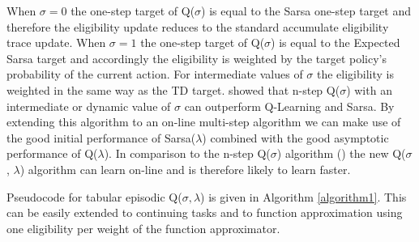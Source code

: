 \documentclass{article} %
\begin{document}
When $\sigma = 0$ the one-step target of Q($\sigma$) is equal to the Sarsa one-step target and therefore the eligibility update reduces to the standard accumulate eligibility trace update. When $\sigma = 1$ the one-step target of Q($\sigma$) is equal to the Expected Sarsa target and accordingly the eligibility is weighted by the target policy's probability of the current action. For intermediate values of $\sigma$ the eligibility is weighted in the same way as the TD target. \cite{deasis2017} showed that n-step Q($\sigma$) with an intermediate or dynamic value of $\sigma$ can outperform Q-Learning and Sarsa. By extending this algorithm to an on-line multi-step algorithm we can make use of the good initial performance of Sarsa($\lambda$) combined with the good asymptotic performance of Q($\lambda$). In comparison to the n-step Q($\sigma$) algorithm (\cite{deasis2017}) the new Q($\sigma$, $\lambda$) algorithm can learn on-line and is therefore likely to learn faster. 

Pseudocode for tabular episodic Q($\sigma, \lambda$) is given in Algorithm \ref{algorithm1}. This can be easily extended to continuing tasks and to function approximation using one eligibility per weight of the function approximator.
\end{document}
